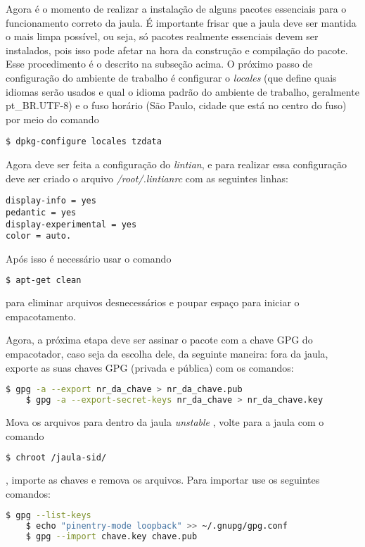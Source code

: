 Agora é o momento de realizar a instalação de alguns pacotes essenciais para o funcionamento correto da jaula. É importante frisar que a jaula deve ser mantida o mais limpa possível, ou seja, só pacotes realmente essenciais devem ser instalados, pois isso pode afetar na hora da construção e compilação do pacote. Esse procedimento é o descrito na subseção acima. O próximo passo de configuração do ambiente de trabalho é configurar o \textit{locales} (que define quais idiomas serão usados e qual o idioma padrão do ambiente de trabalho, geralmente pt\_BR.UTF-8) e o fuso horário (São Paulo, cidade que está no centro do fuso) por meio do comando
\begin{verbatim}
$ dpkg-configure locales tzdata
\end{verbatim}
Agora deve ser feita a configuração do \textit{lintian}, e para realizar essa configuração deve ser criado o arquivo \textit{/root/.lintianrc} com as seguintes linhas: 

\begin{verbatim}
display-info = yes 
pedantic = yes 
display-experimental = yes 
color = auto.
\end{verbatim}

Após isso é necessário usar o comando
\begin{lstlisting}[language=bash]
$ apt-get clean
\end{lstlisting}
para eliminar arquivos desnecessários e poupar espaço para iniciar o empacotamento.

Agora, a próxima etapa deve ser assinar o pacote com a chave GPG do empacotador, caso seja da escolha dele, da seguinte maneira: fora da jaula, exporte as suas chaves GPG (privada e pública) com os comandos: %

\begin{lstlisting}[language=bash]
	$ gpg -a --export nr_da_chave > nr_da_chave.pub 
	$ gpg -a --export-secret-keys nr_da_chave > nr_da_chave.key
\end{lstlisting} 

Mova os arquivos para dentro da jaula \textit{unstable}%
, volte para a jaula com o comando
\begin{lstlisting}[language=bash]
$ chroot /jaula-sid/
\end{lstlisting}
, importe as chaves e remova os arquivos. Para importar use os seguintes comandos: %

\begin{lstlisting}[language=bash]
	$ gpg --list-keys 
	$ echo "pinentry-mode loopback" >> ~/.gnupg/gpg.conf 
	$ gpg --import chave.key chave.pub 
\end{lstlisting}

